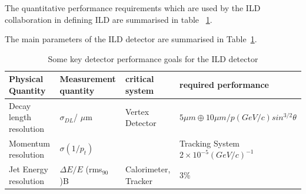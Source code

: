 \documentclass[%
 amsmath,amssymb,
 aps,
]{revtex4-1}
\renewcommand{\toprule}{\hline}
\newcommand{\midrule}{\hline}
\newcommand{\bottomrule}{\hline}
\begin{document}
The quantitative performance requirements which are used by the ILD collaboration in defining ILD are summarised in table~
\ref{ild:tab:barrelpara}.

The main parameters of the ILD detector are summarised in Table~\ref{ild:tab:barrelpara}.

\begin{table}\small
\begin{center}
    \begin{tabular}{|l |l|l|l|}
\toprule
Physical Quantity & Measurement quantity & critical system & required performance\\
\midrule
Decay length resolution & $\sigma_{DL}$/ $\mu$m  & Vertex Detector & $ 5 \mu m \oplus 10 \mu m / p(GeV/c)sin^{3/2}\theta$ \\
\midrule
Momentum resolution  & $\sigma(1/p_t)$ & & Tracking System $2 \times 10^{-5} (GeV/c)^{-1}$ \\
\midrule
Jet Energy resolution & $\Delta E/ E $ (rms$_{90}$)B & Calorimeter, Tracker & 3\% \\
\bottomrule
\end{tabular}
\end{center}
\caption{Some key detector performance goals for the ILD detector}
\label{ild:tab:barrelpara}
\end{table}
\end{document}
